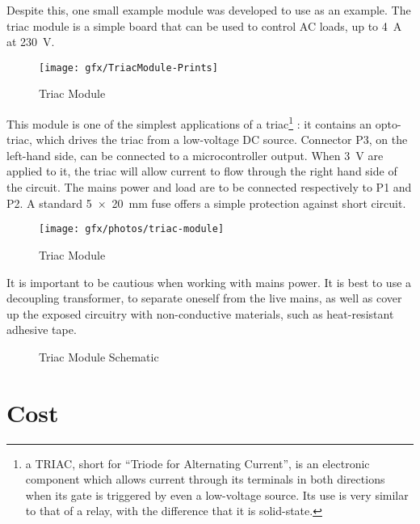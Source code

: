 Despite this, one small example module was developed to use as an example. The
triac module is a simple board that can be used to control AC loads, up to
\SI{4}{A} at \SI{230}{V}.

\begin{figure}[htb]
  \begin{center}
    \texttt{[image: gfx/TriacModule-Prints]}
  \end{center}
  \caption{Triac Module}
  \label{fig:triac-module}
\end{figure}

This module is one of the simplest applications of a triac\footnote{a TRIAC,
short for ``Triode for Alternating Current'', is an electronic component which
allows current through its terminals in both directions when its gate is
triggered by even a low-voltage source. Its use is very similar to that of
a relay, with the difference that it is solid-state.}
: it contains an opto-triac, which drives the triac from a low-voltage DC
source. Connector P3, on the left-hand side, can be connected to
a microcontroller output. When \SI{3}{V} are applied to it, the triac will allow
current to flow through the right hand side of the circuit. The mains power and
load are to be connected respectively to P1 and P2. A standard \SI{5x20}{mm}
fuse offers a simple protection against short circuit.

\begin{figure}[htb]
  \begin{center}
    \texttt{[image: gfx/photos/triac-module]}
  \end{center}
  \caption{Triac Module}
  \label{fig:triac-module-photo}
\end{figure}

It is important to be cautious when working with mains power. It is best to use
a decoupling transformer, to separate oneself from the live mains, as well as
cover up the exposed circuitry with non-conductive materials, such as
heat-resistant adhesive tape.

\begin{figure}[htb]
    \begin{center}
    \end{center}
  \caption{Triac Module Schematic}
  \label{fig:triac-schematic}
\end{figure}

\section{Cost}\label{sec:cost}


